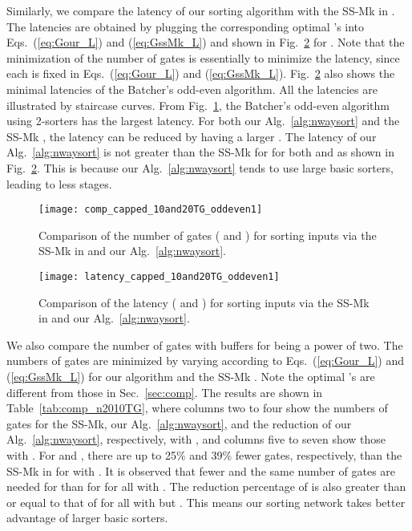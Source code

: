 \documentclass[10pt,journal,cspaper,compsoc]{IEEEtran}
\begin{document}
Similarly, we compare the latency of our sorting algorithm with the SS-Mk in \cite{gao1997sloping}. The latencies are obtained by plugging the corresponding optimal 's into Eqs.~(\ref{eq:Gour_L}) and (\ref{eq:GssMk_L}) and shown in Fig.~\ref{fig:latency_cap_n1020TG} for .
Note that the minimization of the number of gates is essentially to minimize the latency, since each  is fixed in Eqs.~(\ref{eq:Gour_L}) and (\ref{eq:GssMk_L}).
Fig.~\ref{fig:latency_cap_n1020TG} also shows the minimal latencies of the Batcher's odd-even algorithm. All the latencies are illustrated by staircase curves. From Fig.~\ref{fig:comp_cap_n1020TG}, the Batcher's odd-even algorithm using 2-sorters has the largest latency.
For both our Alg.~\ref{alg:nwaysort} and the SS-Mk \cite{gao1997sloping}, the latency can be reduced by having a larger .
The latency of our Alg.~\ref{alg:nwaysort} is not greater than the SS-Mk for  for both  and  as shown in Fig.~\ref{fig:latency_cap_n1020TG}. This is because our Alg.~\ref{alg:nwaysort} tends to use large basic sorters, leading to less stages.

\begin{figure}[!t]
\centering
\texttt{[image: comp\_capped\_10and20TG\_oddeven1]}
\caption{Comparison of the number of gates ( and ) for sorting  inputs via the SS-Mk in \cite{gao1997sloping} and our Alg.~\ref{alg:nwaysort}.}
\label{fig:comp_cap_n1020TG}
\end{figure}

\begin{figure}[!t]
\centering
\texttt{[image: latency\_capped\_10and20TG\_oddeven1]}
\caption{Comparison of the latency ( and ) for sorting  inputs via the SS-Mk in \cite{gao1997sloping} and our Alg.~\ref{alg:nwaysort}.}
\label{fig:latency_cap_n1020TG}
\end{figure}

We also compare the number of gates with buffers for  being a power of two.
The numbers of gates are minimized by varying  according to Eqs.~(\ref{eq:Gour_L}) and (\ref{eq:GssMk_L}) for our algorithm and the SS-Mk \cite{gao1997sloping}. Note the optimal 's are different from those in Sec.~\ref{sec:comp}.
The results are shown in Table~\ref{tab:comp_n2010TG}, where columns two to four show the numbers of gates for the SS-Mk, our Alg.~\ref{alg:nwaysort}, and the reduction of our Alg.~\ref{alg:nwaysort}, respectively, with , and columns five to seven show those with . For  and , there are up to 25\% and 39\% fewer gates, respectively, than the SS-Mk in \cite{gao1997sloping} for  with .
It is observed that fewer and the same number of gates are needed for  than for  for all  with . The reduction percentage of  is also greater than or equal to that of  for all  with  but .
This means our sorting network takes better advantage of larger basic sorters.
\end{document}
